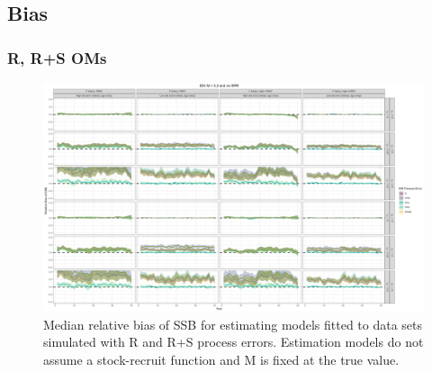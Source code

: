 \documentclass[
  12pt,
]{article}
\begin{document}
\clearpage

\hypertarget{bias-1}{%
\subsection*{Bias}\label{bias-1}}

\hypertarget{r-rs-oms}{%
\subsubsection*{R, R+S OMs}\label{r-rs-oms}}

\begin{landscape}
\begin{figure}
\caption{Median relative bias of SSB for estimating models fitted to data sets simulated with R and R+S process errors.  Estimation models do not assume a stock-recruit function and M is fixed at the true value.}\label{naa_om_em_R_MF_relbias_ssb}
\begin{center}
\includegraphics[width = \textwidth]{naa_om_R_MF_relbias_ssb.png}
\end{center}
\end{figure}
\end{landscape}
\end{document}
